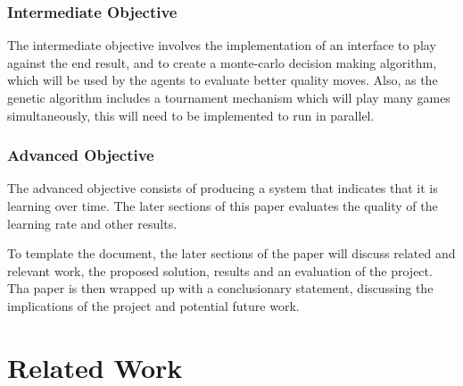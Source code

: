 \documentclass[12pt,a4paper]{article}
\begin{document}
    \subsubsection*{Intermediate Objective}
        The intermediate objective involves the implementation of an interface to play against the end result, and to create a monte-carlo decision making algorithm, which will be used by the agents to evaluate better quality moves. Also, as the genetic algorithm includes a tournament mechanism which will play many games simultaneously, this will need to be implemented to run in parallel.
        
    \subsubsection*{Advanced Objective}
        The advanced objective consists of producing a system that indicates that it is learning over time. The later sections of this paper evaluates the quality of the learning rate and other results. 
    
    To template the document, the later sections of the paper will discuss related and relevant work, the proposed solution, results and an evaluation of the project. Tha paper is then wrapped up with a conclusionary statement, discussing the implications of the project and potential future work.

\section{Related Work}
\end{document}
